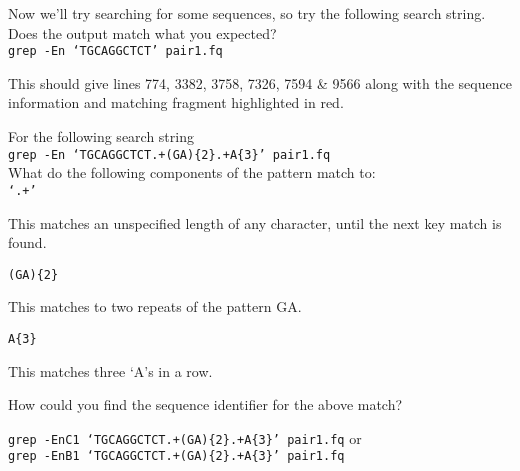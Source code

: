 \begin{steps}
Now we'll try searching for some sequences, so try the following search string. 
Does the output match what you expected? \\
\texttt{grep -En `TGCAGGCTCT' pair1.fq}
\end{steps}

This should give lines 774, 3382, 3758, 7326, 7594 \& 9566 along with the sequence information and matching fragment highlighted in red.\\

\begin{questions}
For the following search string \\
\texttt{grep -En `TGCAGGCTCT.+(GA)\{2\}.+A\{3\}' pair1.fq} \\
What do the following components of the pattern match to: \\
\texttt{`.+'} \\
\begin{answer}
This matches an unspecified length of any character, until the next key match is found. \\
\end{answer}

\texttt{(GA)\{2\}} \\
\begin{answer}
This matches to two repeats of the pattern GA. \\
\end{answer}

\texttt{A\{3\}}\\
\begin{answer}
This matches three `A's in a row. \\
\end{answer}

How could you find the sequence identifier for the above match?\\
\begin{answer}
\texttt{grep -EnC1 `TGCAGGCTCT.+(GA)\{2\}.+A\{3\}' pair1.fq} or \\
\texttt{grep -EnB1 `TGCAGGCTCT.+(GA)\{2\}.+A\{3\}' pair1.fq}
\end{answer}
\end{questions}
